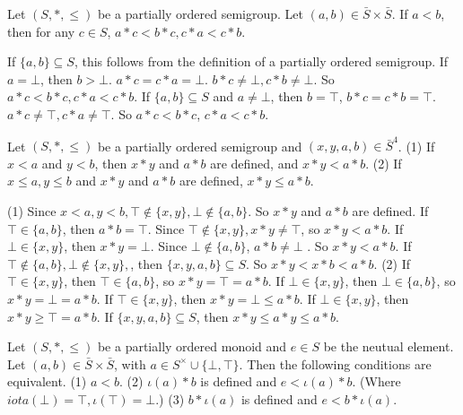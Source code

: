 \begin{propositionenv}
    Let $(S,*,\le)$ be a partially ordered semigroup. Let $(a,b)\in \bar{S}\times \bar{S}$. If $a<b$, then for any $c\in S$, $a*c<b*c,c*a<c*b$.
\end{propositionenv}
\begin{proofenv}
    If $\{a,b\}\subseteq S$, this follows from the definition of a partially ordered semigroup. If $a=\bot$, then $b>\bot$. $a*c=c*a=\bot$. $b*c\not=\bot, c*b\not=\bot$. So $a*c<b*c,c*a<c*b$. If $\{a,b\}\subseteq S$ and $a\not=\bot$, then $b=\top$, $b*c=c*b=\top$. $a*c\not=\top,c*a\not=\top$. So $a*c<b*c$, $c*a<c*b$.
\end{proofenv}
\begin{propositionenv}
    \quad \newline
    Let $(S,*,\le)$  be a partially ordered semigroup and $(x,y,a,b)\in \bar{S}^4$. 
    \newline
    (1) If $x<a$ and $y<b$, then $x*y$ and $a*b$ are defined, and $x*y<a*b$.
    \newline
    (2) If $x\le a, y\le b$ and $x*y$  and $a*b$ are defined, $x*y\le a*b$.
\end{propositionenv}
\begin{proofenv}
    \quad\newline
    (1) Since $x<a,y<b, \top\notin\{x,y\},\bot\notin\{a,b\}$. So $x*y$ and $a*b$ are defined.
    If $\top\in \{a,b\}$, then $a*b=\top$. Since $\top\notin\{x,y\},x*y\not=\top$, so $x*y<a*b$.
    If $\bot\in\{x,y\}$, then $x*y=\bot$. Since $\bot\notin\{a,b\}$, $a*b\not=\bot$ . So $x*y<a*b$.
    If $\top\notin\{a,b\},\bot\notin\{x,y\},$, then $\{x,y,a,b\}\subseteq S$. So $x*y<x*b<a*b$.
    \newline
    (2) If $\top\in\{x,y\}$, then $\top\in \{a,b\}$, so $x*y=\top=a*b$.
    If $\bot\in\{x,y\}$, then $\bot\in\{a,b\}$, so $x*y=\bot=a*b$.
    If $\top\in \{x,y\}$, then $x*y=\bot\le a*b$.
    If $\bot\in\{x,y\}$, then $x*y\ge \top= a*b$.
    If $\{x,y,a,b\}\subseteq S$, then $x*y\le a*y \le a*b$.
\end{proofenv}
\begin{propositionenv}
    Let $(S,*,\le)$ be a partially ordered monoid and $e\in S$ be the neutual element. Let $(a,b)\in \bar{S}\times\bar{S}$, with $a\in S^\times\cup\{\bot,\top\}$. Then the following conditions are equivalent.
    \newline
    (1) $a<b$.
    \newline
    (2) $\iota(a)*b$ is defined and $e<\iota(a)*b$. (Where $iota(\bot)=\top, \iota(\top)=\bot$.)
    \newline
    (3) $b*\iota(a)$ is defined and $e<b*\iota(a)$.
\end{propositionenv}
